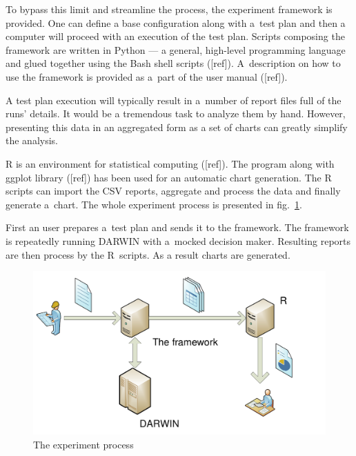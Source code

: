 To bypass this limit and streamline the process, the experiment framework is
provided. One can define a base configuration along with a~test plan and then
a computer will proceed with an execution of the test plan. Scripts composing
the framework are written in Python --- a general, high-level programming
language and glued together using the Bash shell scripts
([ref]). A~description on how to use the framework is provided as a~part of
the user manual ([ref]).

A test plan execution will typically result in a~number of report files full
of the runs' details. It would be a tremendous task to analyze them by
hand. However, presenting this data in an aggregated form as a set of charts
can greatly simplify the analysis.

R is an environment for statistical computing ([ref]). The program along with
ggplot library ([ref]) has been used for an automatic chart generation. The R
scripts can import the CSV reports, aggregate and process the data and finally
generate a~chart. The whole experiment process is presented in
fig.~\ref{framework}.

First an user prepares a~test plan and sends it to the framework. The
framework is repeatedly running DARWIN with a~mocked decision maker. Resulting
reports are then process by the R~scripts. As a result charts are generated.

\begin{figure}
  \centering \includegraphics[width=\textwidth]{img/framework}
  \caption{The experiment process}
  \label{framework}
\end{figure}

